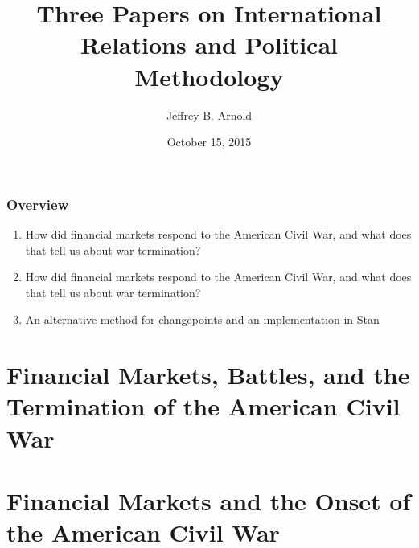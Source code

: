 \documentclass[]{beamer}\usepackage[]{graphicx}\usepackage[]{color}
\title{Three Papers on International Relations and Political Methodology}
\author{Jeffrey B. Arnold}
\date{October 15, 2015}
\begin{document}
\begin{frame}
  \frametitle{Overview}
  \begin{enumerate}
  \item How did financial markets respond to the American Civil War, and 
    what does that tell us about war termination?
  \item How did financial markets respond to the American Civil War, and 
    what does that tell us about war termination?
  \item An alternative method for changepoints and an implementation in Stan
  \end{enumerate}

\end{frame}

\section{Financial Markets, Battles, and the Termination of the American Civil War}

\begin{frame}
  
\end{frame}

\begin{frame}
  \frametitle{}
\end{frame}


\section{Financial Markets and the Onset of the American Civil War}
\end{document}
